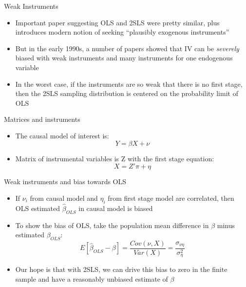 \documentclass{beamer}
\begin{document}
\begin{frame}{Weak Instruments}
	
	\begin{itemize}
	\item Important paper suggesting OLS and 2SLS were pretty similar, plus introduces modern notion of seeking ``plausibly exogenous instruments''
	\item But in the early 1990s, a number of papers showed that IV can be \emph{severely} biased with weak instruments and many instruments for one endogenous variable
	\item In the worst case, if the instruments are so weak that there is no first stage, then the 2SLS sampling distribution is centered on the probability limit of OLS
	\end{itemize}
\end{frame}



\begin{frame}{Matrices and instruments}

\begin{itemize}
	\item The causal model of interest is: $$Y=\beta X + \nu$$
	\item Matrix of instrumental variables is Z with the first stage equation:$$X = {Z'}\pi + \eta$$
\end{itemize}

\end{frame}

\begin{frame}{Weak instruments and bias towards OLS}


\begin{itemize}
	\item If $\nu_i$ from causal model and $\eta_i$ from first stage model are correlated, then OLS estimated $\widehat{\beta}_{OLS}$ in causal model is biased
	\item To show the bias of OLS, take the population mean difference in $\beta$ minus estimated $\beta_{OLS}$: $$E[\widehat{\beta}_{OLS} - \beta] = \frac{ Cov(\nu, X)}{Var(X)} = \frac{\sigma_{\nu \eta}}{\sigma^2_\eta}$$
	\item Our hope is that with 2SLS, we can drive this bias to zero in the finite sample and have a reasonably unbiased estimate of $\beta$ 
\end{itemize}

\end{frame}
\end{document}
